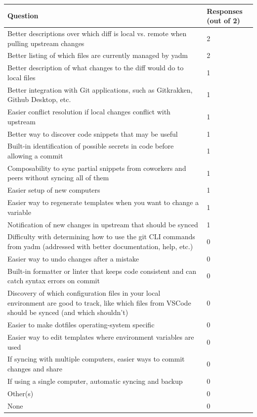 \documentclass[letterpaper]{jdf}
\begin{document}
\begin{jdftable}
\label{table:targeted_needfinding}
\small %
\begin{tabular}{@{} L{0.8\linewidth} L{0.2\linewidth}}
    \textbf{Question} & \textbf{Responses (out of 2)} \\
    \toprule[0.5pt]
    Better descriptions over which diff is local vs. remote when pulling upstream changes & 2 \\
    \midrule
    Better listing of which files are currently managed by yadm & 2 \\
    \midrule
    Better description of what changes to the diff would do to local files & 1 \\
    \midrule
    Better integration with Git applications, such as Gitkrakken, Github Desktop, etc. & 1 \\
    \midrule
    Easier conflict resolution if local changes conflict with upstream & 1 \\
    \midrule
    Better way to discover code snippets that may be useful & 1 \\
    \midrule
    Built-in identification of possible secrets in code before allowing a commit & 1 \\
    \midrule
    Composability to sync partial snippets from coworkers and peers without syncing all of them & 1 \\
    \midrule
    Easier setup of new computers & 1 \\
    \midrule
    Easier way to regenerate templates when you want to change a variable & 1 \\
    \midrule
    Notification of new changes in upstream that should be synced & 1 \\
    \midrule
    Difficulty with determining how to use the git CLI commands from yadm (addressed with better documentation, help, etc.) & 0 \\
    \midrule
    Easier way to undo changes after a mistake & 0 \\
    \midrule
    Built-in formatter or linter that keeps code consistent and can catch syntax errors on commit & 0 \\
    \midrule
    Discovery of which configuration files in your local environment are good to track, like which files from VSCode should be synced (and which shouldn't) & 0 \\
    \midrule
    Easier to make dotfiles operating-system specific & 0 \\
    \midrule
    Easier way to edit templates where environment variables are used & 0 \\
    \midrule
    If syncing with multiple computers, easier ways to commit changes and share & 0 \\
    \midrule
    If using a single computer, automatic syncing and backup & 0 \\
    \midrule
    Other(s) & 0 \\
    \midrule
    None & 0 \\
\end{tabular}
\end{jdftable}
\end{document}
